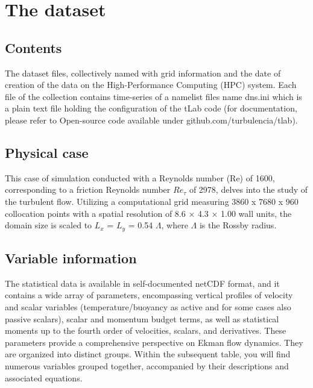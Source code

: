 \documentclass[11pt]{article}
\begin{document}
\section{The dataset}

\subsection{Contents}

The dataset files, collectively named with grid information and the date of creation of the data on the High-Performance Computing (HPC) system. Each file of the collection contains time-series of a namelist files name dns.ini which is a plain text file holding the configuration of the tLab code (for documentation, please refer to Open-source code available under github.com/turbulencia/tlab). \\

\subsection{Physical case}

This case of simulation conducted with a Reynolds number (Re) of 1600, corresponding to a friction Reynolds number \(Re_{\tau}\) of 2978, delves into the study of the turbulent flow. Utilizing a computational grid measuring 3860 x 7680 x 960 collocation points with a spatial resolution of 8.6 × 4.3 × 1.00 wall units, the domain size is scaled to \(L_x\) = \(L_y\) = 0.54 \(\Lambda\), where \(\Lambda\) is the Rossby radius.\\

\subsection{Variable information}

The statistical data is available in self-documented netCDF format, and it contains a wide array of parameters, encompassing vertical profiles of velocity and scalar variables (temperature/buoyancy as active and for some cases also passive scalars), scalar and momentum budget terms, as well as statistical moments up to the fourth order of velocities, scalars, and derivatives. These parameters provide a comprehensive perspective on Ekman flow dynamics. They are organized into distinct groups. Within the subsequent table, you will find numerous variables grouped together, accompanied by their descriptions and associated equations.
\end{document}
